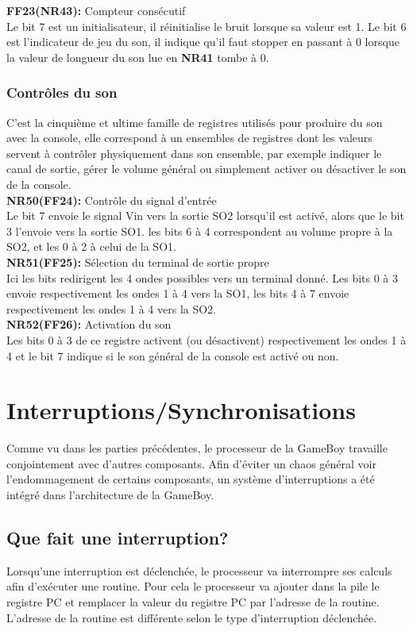 \documentclass{report}
\begin{document}
		\textbf{FF23(NR43):} Compteur consécutif\\
		Le bit 7 est un initialisateur, il réinitialise le bruit
		lorsque sa valeur est 1.
		Le bit 6 est l'indicateur de jeu du son, il indique
		qu'il faut stopper en passant à 0 lorsque la valeur de
		longueur du son lue en \textbf{NR41} tombe à 0. 
	\subsubsection{Contrôles du son}
		C'est la cinquième et ultime famille de registres
		utilisés pour produire du son avec la console, elle
		correspond à un ensembles de registres dont les
		valeurs servent à contrôler physiquement dans son
		ensemble, par exemple indiquer le canal de sortie,
		gérer le volume général ou simplement activer ou
		désactiver le son de la console. \\

		\textbf{NR50(FF24):} Contrôle du signal d'entrée \\ 
		Le bit 7 envoie le signal Vin vers la sortie SO2
		lorsqu'il est activé, alors que le bit 3 l'envoie vers
		la sortie SO1. les bits 6 à 4 correspondent au volume
		propre à la SO2, et les 0 à 2 à celui de la SO1. \\

		\textbf{NR51(FF25):} Sélection du terminal de sortie propre \\
		Ici les bits redirigent les 4 ondes possibles vers un
		terminal donné.
		Les bits 0 à 3 envoie respectivement les ondes 1 à 4
		vers la SO1, les bits 4 à 7 envoie respectivement les
		ondes 1 à 4 vers la SO2.\\

		\textbf{NR52(FF26):} Activation du son \\
		Les bits 0 à 3 de ce registre activent (ou
		désactivent) respectivement les ondes 1 à 4 et le bit
		7 indique si le son général de la console est activé
		ou non.
\section{Interruptions/Synchronisations}
Comme vu dans les parties précédentes, le processeur de la GameBoy travaille conjointement avec d'autres composants. Afin d'éviter un chaos général voir l'endommagement de certains composants, un système d'interruptions a été intégré dans l'architecture de la GameBoy.
\subsection{Que fait une interruption?}
Lorsqu'une interruption est déclenchée, le processeur va interrompre ses calculs afin d'exécuter une routine. Pour cela le processeur va ajouter dans la pile le registre PC et remplacer la valeur du registre PC par l'adresse de la routine. L'adresse de la routine est différente selon le type d'interruption déclenchée.
\end{document}
